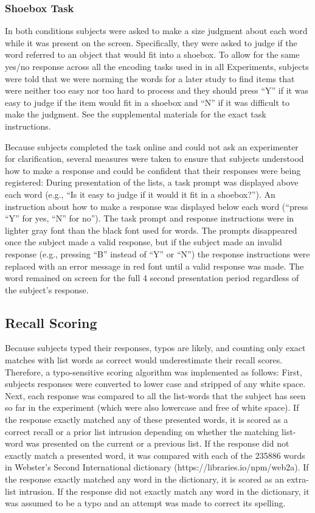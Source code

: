 \documentclass[jou,natbib]{apa6} %
\begin{document}
\subsubsection{Shoebox Task} In both conditions subjects were asked to make a size judgment about each word while it was present on the screen. Specifically, they were asked  to judge if the word referred to an object that would fit into a shoebox. To allow for the same yes/no response across all the encoding tasks used in in all Experiments, subjects were told that we were norming the words for a later study to find items that were neither too easy nor too hard to process and they should press ``Y'' if it was easy to judge if the item would fit in a shoebox and ``N'' if it was difficult to make the judgment. See the supplemental materials for the exact task instructions.

Because subjects completed the task online and could not ask an experimenter for clarification, several measures were taken to ensure that subjects understood how to make a response and could be confident that their responses were being registered: During presentation of the lists, a task prompt was displayed above each word (e.g., ``Is it easy to judge if it would it fit in a shoebox?''). An instruction about how to make a response was displayed below each word (``press ``Y'' for yes, ``N'' for no''). The task prompt and response instructions were in lighter gray font than the black font used for words. The prompts disappeared once the subject made a valid response, but if the subject made an invalid response (e.g., pressing ``B'' instead of ``Y'' or ``N'') the response instructions were replaced with an error message in red font until a valid response was made. The word remained on screen for the full 4 second presentation period regardless of the subject's response.

\subsection{Recall Scoring}
Because subjects typed their responses, typos are likely, and counting only exact matches with list words as correct would underestimate their recall scores. Therefore, a typo-sensitive scoring algorithm was implemented as follows: First, subjects responses were converted to lower case and stripped of any white space. Next, each response was compared to all the list-words that the subject has seen so far in the experiment (which were also lowercase and free of white space). If the response exactly matched any of these presented words, it is scored as a correct recall or a prior list intrusion depending on whether the matching list-word was presented on the current or a previous list. If the response did not exactly match a presented word, it was compared with each of the 235886 words in Webster's Second International dictionary (https://libraries.io/npm/web2a). If the response exactly matched any word in the dictionary, it is scored as an extra-list intrusion. If the response did not exactly match any word in the dictionary, it was assumed to be a typo and an attempt was made to correct its spelling.
\end{document}
